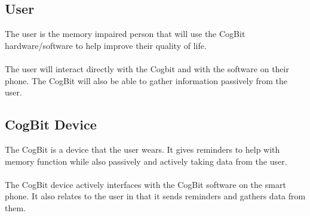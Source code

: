 \documentclass[12pt]{article}
\begin{document}
\begin{multicols}{2}
\subsection*{User}
The user is the memory impaired person that will use the CogBit hardware/software to help improve their quality of life.\\
\\
The user will interact directly with the Cogbit and with the software on their phone.  The CogBit will also be able to gather information passively from the user.

\subsection*{CogBit Device}
The CogBit is a device that the user wears.  It gives reminders to help with memory function while also passively and actively taking data from the user.\\
\\
The CogBit device actively interfaces with the CogBit software on the smart phone.  It also relates to the user in that it sends reminders and gathers data from them.


\end{multicols}
\end{document}
